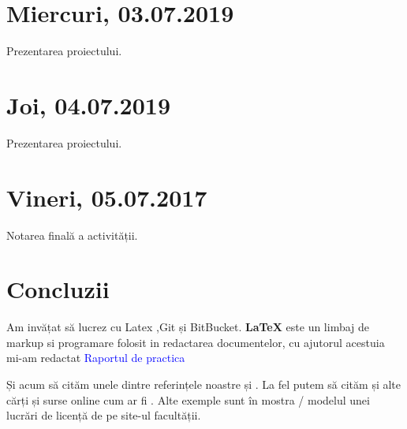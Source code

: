\documentclass{report}
\begin{document}
\chapter{Miercuri, 03.07.2019}
Prezentarea proiectului.
\chapter{Joi, 04.07.2019}
Prezentarea proiectului.
\chapter{Vineri, 05.07.2017}
Notarea finală a activității.

\chapter{Concluzii}
Am invățat să lucrez cu Latex ,Git și BitBucket. 
\newline
\textbf {LaTeX } este un limbaj de markup si programare folosit in redactarea documentelor, cu ajutorul acestuia mi-am redactat \textcolor{blue}{Raportul de practica}

Și acum să cităm unele dintre referințele noastre \cite{DUMMY:1} și \cite{book:25008}. La fel putem să cităm și alte cărți și surse online cum ar fi \cite{book:776133, book:1045183}. Alte exemple sunt în mostra / modelul unei lucrări de licență de pe site-ul facultății. 


 

\end{document}
